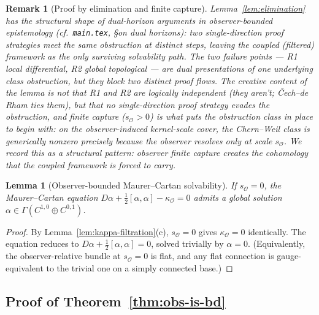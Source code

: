 \documentclass[11pt]{article}
\newtheorem{lemma}{Lemma}
\newtheorem{remark}{Remark}
\newcommand{\Obs}{\mathcal{O}}
\newcommand{\kappaO}{\kappa_{\Obs}}
\newcommand{\rmin}{s_{\Obs}}
\begin{document}
\begin{remark}[Proof by elimination and finite capture]
\label{rem:elim-structural}
Lemma~\ref{lem:elimination} has the structural shape of
dual-horizon arguments in observer-bounded epistemology
(cf.\ \texttt{main.tex}, \S on dual horizons): two
single-direction proof strategies meet the same obstruction at
distinct steps, leaving the coupled (filtered) framework as the
only surviving solvability path. The two failure points --- R1
\emph{local differential}, R2 \emph{global topological} --- are
dual presentations of one underlying class obstruction, but they
block two distinct proof flows. The creative content of the
lemma is not that R1 and R2 are logically independent (they
aren't; \v{C}ech--de Rham ties them), but that \emph{no
single-direction proof strategy evades the obstruction}, and
finite capture ($\rmin > 0$) is what puts the obstruction class
in place to begin with: on the observer-induced kernel-scale
cover, the Chern--Weil class is generically nonzero precisely
because the observer resolves only at scale $\rmin$. We record
this as a structural pattern: \emph{observer finite capture
creates the cohomology that the coupled framework is forced to
carry}.
\end{remark}

\begin{lemma}[Observer-bounded Maurer--Cartan solvability]
\label{lem:MC-solvability}
If $\rmin = 0$, the Maurer--Cartan equation
$D\alpha + \tfrac{1}{2}[\alpha, \alpha] - \kappaO = 0$ admits a
global solution
$\alpha \in \Gamma(C^{1, 0} \oplus C^{0, 1})$.
\end{lemma}

\begin{proof}
By Lemma~\ref{lem:kappa-filtration}(c), $\rmin = 0$ gives
$\kappaO = 0$ identically. The equation reduces to
$D\alpha + \tfrac{1}{2}[\alpha, \alpha] = 0$, solved trivially by
$\alpha = 0$. (Equivalently, the observer-relative bundle at
$\rmin = 0$ is flat, and any flat connection is gauge-equivalent
to the trivial one on a simply connected base.)
\end{proof}

\subsection*{Proof of Theorem~\ref{thm:obs-is-bd}}
\end{document}
